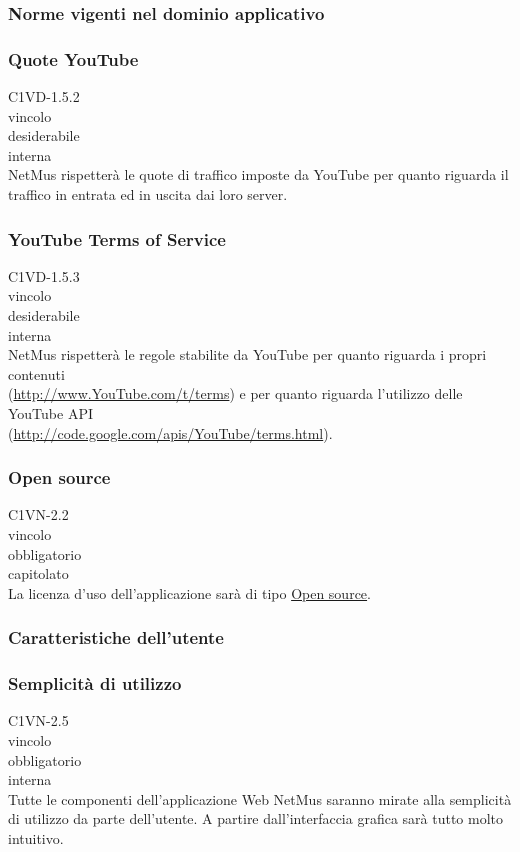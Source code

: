 \subsubsection{Norme vigenti nel dominio applicativo}

\subsubsection*{Quote YouTube}
 C1VD-1.5.2 \\
 vincolo \\
 desiderabile \\
 interna \\
NetMus rispetter\`a le quote di traffico imposte da YouTube per quanto riguarda
il traffico in entrata ed in uscita dai loro server.

\subsubsection*{YouTube Terms of Service}
 C1VD-1.5.3 \\
 vincolo \\
 desiderabile \\
 interna \\
NetMus rispetter\`a le regole stabilite da YouTube per quanto riguarda i
propri contenuti \\(\url{http://www.YouTube.com/t/terms}) e per quanto
riguarda l'utilizzo delle YouTube API\\
(\url{http://code.google.com/apis/YouTube/terms.html}).

\subsubsection*{Open source}
 C1VN-2.2 \\
 vincolo \\
 obbligatorio \\
 capitolato \\
La licenza d'uso dell'applicazione sar\`a di tipo \underline{Open source}.

\subsubsection{Caratteristiche dell'utente}

\subsubsection*{Semplicit\`a di utilizzo}
 C1VN-2.5 \\
 vincolo \\
 obbligatorio \\
 interna \\
Tutte le componenti dell'applicazione Web NetMus saranno mirate alla semplicit\`a
di utilizzo da parte dell'utente. A partire dall'interfaccia grafica sar\`a tutto
molto intuitivo.


